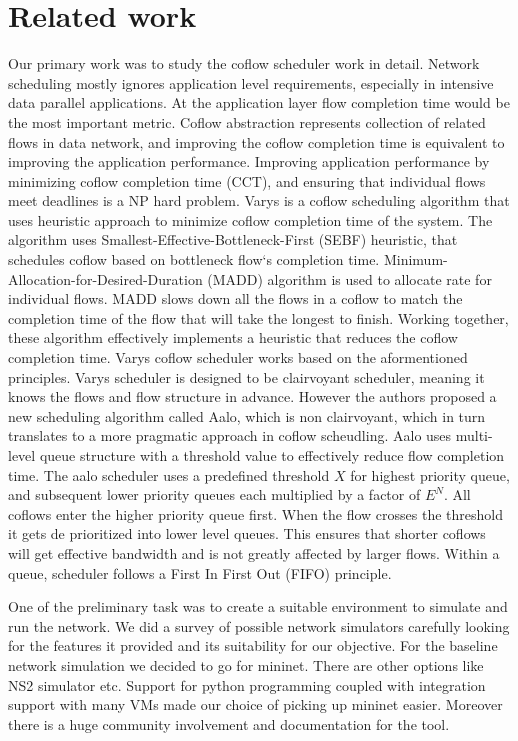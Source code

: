 \documentclass[conference]{IEEEtran}
\begin{document}
\section{Related work}

Our primary work was to study the coflow scheduler work in detail. Network scheduling mostly ignores application level requirements, especially in intensive data parallel applications. At the application layer flow completion time would be the most important metric. Coflow abstraction represents collection of related flows in data network, and improving the coflow completion time is equivalent to improving the application performance. Improving application performance by minimizing coflow completion time (CCT), and ensuring that individual flows meet deadlines is a NP hard problem. Varys\cite{varys} is a coflow scheduling algorithm that uses heuristic approach to minimize coflow completion time of the system. The algorithm uses Smallest-Effective-Bottleneck-First (SEBF) heuristic, that schedules coflow based on bottleneck flow`s completion time. Minimum-Allocation-for-Desired-Duration (MADD) algorithm is used to allocate rate for individual flows. MADD slows down all the flows in a coflow to match the completion time of the flow that will take the longest to finish. Working together, these algorithm effectively implements a heuristic that reduces the coflow completion time. Varys coflow scheduler works based on the aformentioned principles. Varys scheduler is designed to be clairvoyant scheduler, meaning it knows the flows and flow structure in advance. However the authors proposed a new scheduling algorithm called Aalo\cite{aalo}, which is non clairvoyant, which in turn translates to a more pragmatic approach in coflow scheudling. Aalo uses multi-level queue structure with a threshold value to effectively reduce flow completion time. The aalo scheduler uses a predefined threshold \(X\) for highest priority queue, and subsequent lower priority queues each multiplied by a factor of \(E^N\). All coflows enter the higher priority queue first. When the flow crosses the threshold it gets de prioritized into lower level queues. This ensures that shorter coflows will get effective bandwidth and is not greatly affected by larger flows. Within a queue, scheduler follows a First In First Out (FIFO) principle.

One of the preliminary task was to create a suitable environment to simulate and run the network. We did a survey of possible network simulators carefully looking for the features it provided and its suitability for our objective. For the baseline network simulation we decided to go for mininet\cite{Mininet}. There are other options like NS2 simulator etc. Support for python programming coupled with integration support with many VMs made our choice of picking up mininet easier. Moreover there is a huge community involvement and documentation for the tool.
\end{document}
